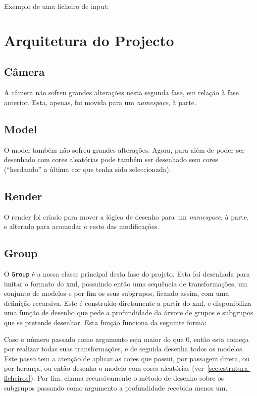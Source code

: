 \documentclass[a4paper]{article}
\begin{document}
\pagebreak
Exemplo de uma ficheiro de input:


\pagebreak

\section{Arquitetura do Projecto}

\subsection{Câmera}

A câmera não sofreu grandes alterações nesta segunda fase, em relação à fase anterior. Esta, apenas, foi movida para um \textit{namespace}, à parte.

\subsection{Model}

O model também não sofreu grandes alterações. Agora, para além de poder ser desenhado com cores aleatórias pode também ser desenhado sem cores (``herdando'' a última cor que tenha sido seleccionada).

\subsection{Render}

O render foi criado para mover a lógica de desenho para um \textit{namespace}, à
parte, e alterado para acomodar o resto das modificações.

\subsection{Group}

O \texttt{Group} é a nossa classe principal desta fase do projeto. Esta foi
desenhada para imitar o formato do xml, possuindo então uma sequência de
transformações, um conjunto de modelos e por fim os seus subgrupos, ficando
assim, com uma definição recursiva. Este é construído diretamente a partir do
xml, e disponibiliza uma função de desenho que pede a profundidade da árvore
de grupos e subgrupos que se pretende desenhar. Esta função funciona da
seguinte forma:

Caso o número passado como argumento seja maior do que 0, então esta começa por realizar todas
suas transformações, e de seguida desenha todos os modelos. Este passo tem a
atenção de aplicar as cores que possui, por passagem direta, ou por herança,
ou então desenha o modelo com cores aleatórias
(ver~\ref{sec:estrutura-ficheiros}). Por fim, chama recursivamente o método de
desenho sobre os subgrupos passando como argumento a profundidade recebida menos um.
\end{document}
